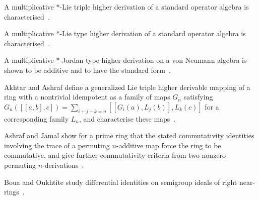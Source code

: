 A multiplicative $*$-Lie triple higher derivation of a standard operator algebra is characterised~\cite{WlMultiplicativeStar-lieTrip2020}.

A multiplicative $*$-Lie type higher derivation of a standard operator algebra is characterised~\cite{WlMultiplicativeStar-lieType2021}.

A multiplicative $*$-Jordan type higher derivation on a von Neumann algebra is shown to be additive and to have the standard form~\cite{WlMultiplicativeStar-jordanT2021}.

Akhtar and Ashraf define a generalized Lie triple higher derivable mapping of a ring with a nontrivial idempotent as a family of maps $G_n$ satisfying $G_n([[a,b],c])=\sum_{i+j+k=n}[[G_i(a),L_j(b)],L_k(c)]$ for a corresponding family $L_n$, and characterise these maps~\cite{WlGeneralizedLieTripleHigherDeri2021}.

Ashraf and Jamal show for a prime ring that the stated commutativity identities involving the trace of a permuting $n$-additive map force the ring to be commutative, and give further commutativity criteria from two nonzero permuting $n$-derivations~\cite{WlTracesOfPermutingNAdditiveMaps2014}.

Boua and Oukhtite study differential identities on semigroup ideals of right near-rings~\cite{WlDifferentialIdentitiesOnSemigr2013}.

